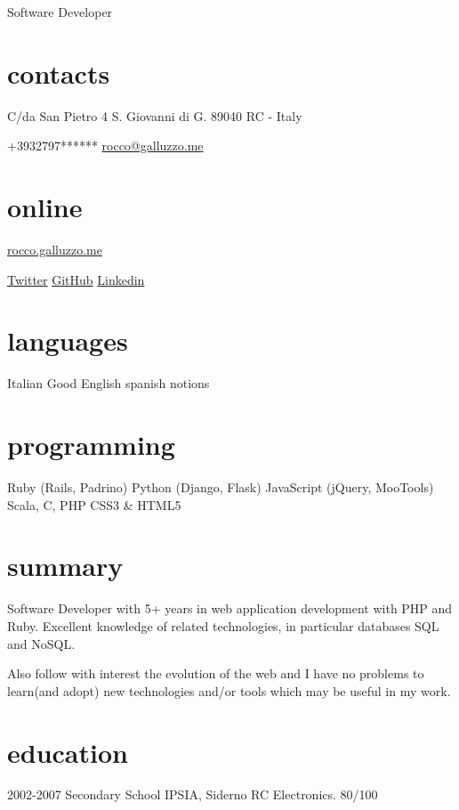 \documentclass[print]{cv}
\begin{document}
       {Software Developer}

\begin{aside}%
\section{contacts}
    C/da San Pietro 4
    S. Giovanni di G.
89040 RC - Italy\par\smallskip%
+3932797******
	\href{mailto:rocco@galluzzo.me}{rocco@galluzzo.me}
	\section{online}
	\href{http://rocco.galluzzo.me}{rocco.galluzzo.me}
         \par\smallskip%
	\href{http://twitter.com/byterussian}{Twitter}
           \href{https://github.com/byterussian}{GitHub}
           \href{http://www.linkedin.com/in/roccogalluzzo}{Linkedin}
  \section{languages}
    Italian
    Good English
    spanish notions
  \section{programming}
    Ruby
    (Rails, Padrino)
    Python
    (Django, Flask)
    JavaScript
    (jQuery, MooTools)
    Scala, C, PHP
    CSS3 \& HTML5
\end{aside}

\section{summary}
Software Developer with 5+ years in web application development with
PHP and Ruby. Excellent knowledge of related technologies, in particular
databases SQL and NoSQL.

Also follow with interest the evolution of the web and I have no problems to learn(and adopt)
new technologies and/or tools which may be useful in my work.
\section{education}

\begin{entrylist}

  \entry
    {2002-2007}
    {Secondary School}
    {IPSIA, Siderno RC}
    {Electronics. 80/100}

\end{entrylist}
\end{document}
